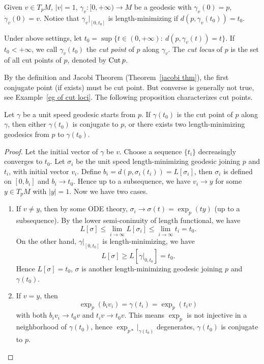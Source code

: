 Given $v\in T_pM$, $|v|=1$, $\gamma_v:[0,+\infty)\to M$ be a geodesic with $\gamma_v(0)=p$, $\dot\gamma_v(0)=v$.
Notice that $\gamma_v|_{[0,t_0]}$ is length-minimizing if $d(p,\gamma_v(t_0))=t_0$.

\begin{defn}
    Under above settings, let $t_0=\sup\{t\in(0,+\infty):\ d(p,\gamma_v(t))=t\}$.
    If $t_0<+\infty$, we call $\gamma_v(t_0)$ the \emph{cut point} of $p$ along $\gamma_v$.
    The \emph{cut locus} of $p$ is the set of all cut points of $p$, denoted by $\operatorname{Cut}{p}$.
\end{defn}

By the definition and Jacobi Theorem (Theorem~\ref{jacobi thm}), the first conjugate point (if exists) must be cut point.
But converse is generally not true, see Example~\ref{eg of cut loci}.
The following proposition characterizes cut points.

\begin{prop}
    Let $\gamma$ be a unit speed geodesic starts from $p$.
    If $\gamma(t_0)$ is the cut point of $p$ along $\gamma$, then either $\gamma(t_0)$ is conjugate to $p$, or there exists two length-minimizing geodesics from $p$ to $\gamma(t_0)$.
\end{prop}
\begin{proof}
    Let the initial vector of $\gamma$ be $v$.
    Choose a sequence $\{t_i\}$ decreasingly converges to $t_0$.
    Let $\sigma_i$ be the unit speed length-minimizing geodesic joining $p$ and $t_i$, with initial vector $v_i$.
    Define $b_i=d(p,\sigma_i(t_i))=L[\sigma_i]$, then $\sigma_i$ is defined on $[0,b_i]$ and $b_i\to t_0$.
    Hence up to a subsequence, we have $v_i\to y$ for some $y\in T_pM$ with $|y|=1$.
    Now we have two cases.
    \begin{enumerate}[(1)]
        \item If $v\neq y$, then by some ODE theory, $\sigma_i\to\sigma(t)=\exp_p(ty)$ (up to a subsequence).
        By the lower semi-coninuity of length functional, we have
        \[L[\sigma]\leq\lim_{i\to\infty}L[\sigma_i]\leq\lim_{i\to\infty}t_i=t_0.\]
        On the other hand, $\gamma|_{[0,t_0]}$ is length-minimizing, we have
        \[L[\sigma]\geq L[\gamma|_{0,t_0}]=t_0.\]
        Hence $L[\sigma]=t_0$, $\sigma$ is another length-minimizing geodesic joining $p$ and $\gamma(t_0)$.
        \item If $v=y$, then
        \[\exp_p(b_iv_i)=\gamma(t_i)=\exp_p(t_iv)\]
        with both $b_iv_i\to t_0v$ and $t_iv\to t_0v$.
        This means $\exp_p$ is not injective in a neighborhood of $\gamma(t_0)$, hence $\exp_{p*}|_{\gamma(t_0)}$ degenerates, $\gamma(t_0)$ is conjugate to $p$.
    \end{enumerate}
\end{proof}

